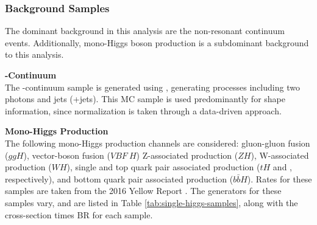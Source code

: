 \subsubsection{Background Samples}

The dominant background in this analysis are the non-resonant \myy continuum events. Additionally, mono-Higgs boson production is a subdominant background to this analysis. 

\noindent\textbf{\yy-Continuum}\\
\indent The \yy-continuum sample is generated using \SHERPA, generating processes including two photons and jets (\yy+jets). This \gls{MC} sample is used predominantly for shape information, since normalization is taken through a data-driven approach. 

\noindent\textbf{Mono-Higgs Production}\\
\indent The following mono-Higgs production channels are considered: gluon-gluon fusion ($ggH$), vector-boson fusion ($VBF\ H$) Z-associated production ($ZH$), W-associated production ($WH$), single and top quark pair associated production ($tH$ and \tth, respectively), and bottom quark pair associated production ($b\bar{b}H$). Rates for these samples are taken from the 2016 Yellow Report \cite{yellow-report}. The generators for these samples vary, and are listed in Table \ref{tab:single-higgs-samples}, along with the cross-section times \gls{BR} for each sample.

